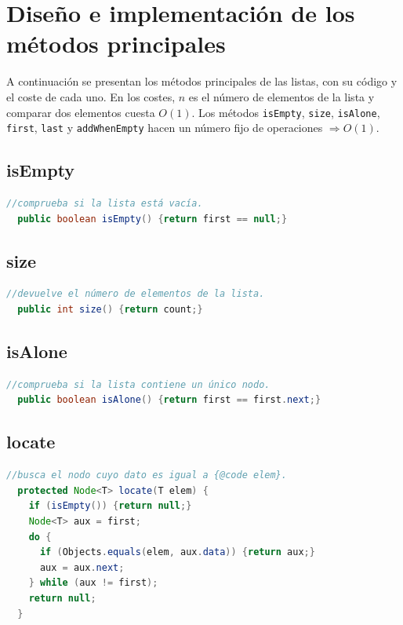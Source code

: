 \documentclass[a4paper,11pt]{report}
\begin{document}
\chapter{Diseño e implementación de los métodos principales}

A continuación se presentan los métodos principales de las listas, con su código y el coste de cada uno. En los costes, $n$ es el número de elementos de la lista y comparar dos elementos cuesta $O(1)$. Los métodos \texttt{isEmpty}, \texttt{size}, \texttt{isAlone}, \texttt{first}, \texttt{last} y \texttt{addWhenEmpty} hacen un número fijo de operaciones $\Rightarrow O(1)$.


\bigskip
\begin{minipage}{0.95\linewidth}
\section{\label{isEmpty}isEmpty}
\begin{lstlisting}[language=Java]
  //comprueba si la lista está vacía.
  public boolean isEmpty() {return first == null;} 
\end{lstlisting}
\end{minipage}\smallskip


\begin{minipage}{0.95\linewidth}
\section{\label{size}size}
\begin{lstlisting}[language=Java]
  //devuelve el número de elementos de la lista.
  public int size() {return count;} 
\end{lstlisting}
\end{minipage}\smallskip


\begin{minipage}{0.95\linewidth}
\section{\label{isAlone}isAlone}
\begin{lstlisting}[language=Java]
  //comprueba si la lista contiene un único nodo.
  public boolean isAlone() {return first == first.next;}
\end{lstlisting}
\end{minipage}\smallskip


\begin{minipage}{0.95\linewidth}
\section{\label{locate}locate}
\begin{lstlisting}[language=Java]
  //busca el nodo cuyo dato es igual a {@code elem}.
  protected Node<T> locate(T elem) {
    if (isEmpty()) {return null;}
    Node<T> aux = first;
    do {
      if (Objects.equals(elem, aux.data)) {return aux;}
      aux = aux.next;
    } while (aux != first);
    return null;
  }
\end{lstlisting}
\end{minipage}\smallskip
\end{document}
